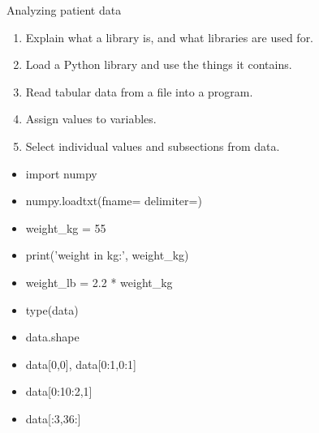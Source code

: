 \documentclass{beamer}
\begin{document}

\begin{frame}{Analyzing patient data}

\begin{enumerate}
    \item{Explain what a library is, and what libraries are used for.}
    \item{Load a Python library and use the things it contains.}
    \item{Read tabular data from a file into a program.}
    \item{Assign values to variables.}
    \item{Select individual values and subsections from data.}
   \end{enumerate}

\begin{multicols}{2}
\begin{itemize}
\item import numpy
\item numpy.loadtxt(fname=  delimiter=)
\item weight\_kg = 55
\item print('weight in kg:', weight\_kg)
\item weight\_lb = 2.2 * weight\_kg
\item type(data)
\item data.shape
\item data[0,0], data[0:1,0:1]
\item data[0:10:2,1]
\item data[:3,36:]
\end{itemize}
\end{multicols}
\end{frame}
\end{document}
